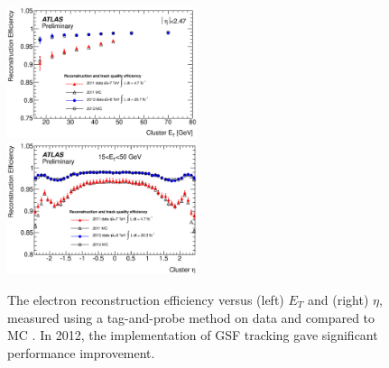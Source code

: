 \begin{figure}
	\includegraphics[width=0.495\textwidth]{tex/selection/el_recoeff_et}
	\hfill
	\includegraphics[width=0.495\textwidth]{tex/selection/el_recoeff_eta}
	\caption{The electron reconstruction efficiency versus (left) $E_T$ and (right) 
	$\eta$, measured using a tag-and-probe method on \HepProcess{\PZ \HepTo \Pe\Pe} data 
	and compared to MC \cite{ElectronPerf:2012}. In 2012, the implementation of GSF 
	tracking gave significant performance improvement.}
	\label{fig:objects:el_recoeff}
\end{figure}

